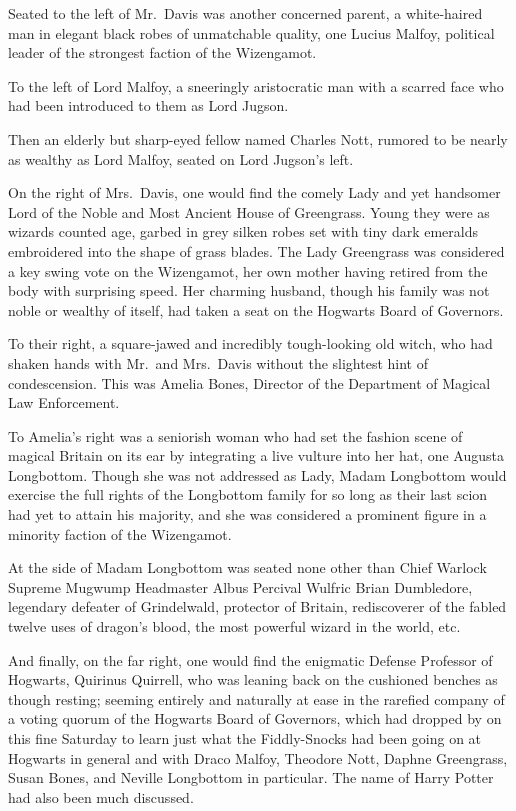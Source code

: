 Seated to the left of Mr.~Davis was another concerned parent, a white-haired
man in elegant black robes of unmatchable quality, one Lucius Malfoy, political
leader of the strongest faction of the Wizengamot.

To the left of Lord Malfoy, a sneeringly aristocratic man with a scarred face
who had been introduced to them as Lord Jugson.

Then an elderly but sharp-eyed fellow named Charles Nott, rumored to be nearly
as wealthy as Lord Malfoy, seated on Lord Jugson's left.

On the right of Mrs.~Davis, one would find the comely Lady and yet handsomer
Lord of the Noble and Most Ancient House of Greengrass. Young they were as
wizards counted age, garbed in grey silken robes set with tiny dark emeralds
embroidered into the shape of grass blades. The Lady Greengrass was considered
a key swing vote on the Wizengamot, her own mother having retired from the body
with surprising speed. Her charming husband, though his family was not noble or
wealthy of itself, had taken a seat on the Hogwarts Board of Governors.

To their right, a square-jawed and incredibly tough-looking old witch, who had
shaken hands with Mr.~and Mrs.~Davis without the slightest hint of
condescension. This was Amelia Bones, Director of the Department of Magical Law
Enforcement.

To Amelia's right was a seniorish woman who had set the fashion scene of
magical Britain on its ear by integrating a live vulture into her hat, one
Augusta Longbottom. Though she was not addressed as Lady, Madam Longbottom
would exercise the full rights of the Longbottom family for so long as their
last scion had yet to attain his majority, and she was considered a prominent
figure in a minority faction of the Wizengamot.

At the side of Madam Longbottom was seated none other than Chief Warlock
Supreme Mugwump Headmaster Albus Percival Wulfric Brian Dumbledore, legendary
defeater of Grindelwald, protector of Britain, rediscoverer of the fabled
twelve uses of dragon's blood, the most powerful wizard in the world, etc.

And finally, on the far right, one would find the enigmatic Defense Professor
of Hogwarts, Quirinus Quirrell, who was leaning back on the cushioned benches
as though resting; seeming entirely and naturally at ease in the rarefied
company of a voting quorum of the Hogwarts Board of Governors, which had
dropped by on this fine Saturday to learn just what the Fiddly-Snocks had been
going on at Hogwarts in general and with Draco Malfoy, Theodore Nott, Daphne
Greengrass, Susan Bones, and Neville Longbottom in particular. The name of
Harry Potter had also been much discussed.

